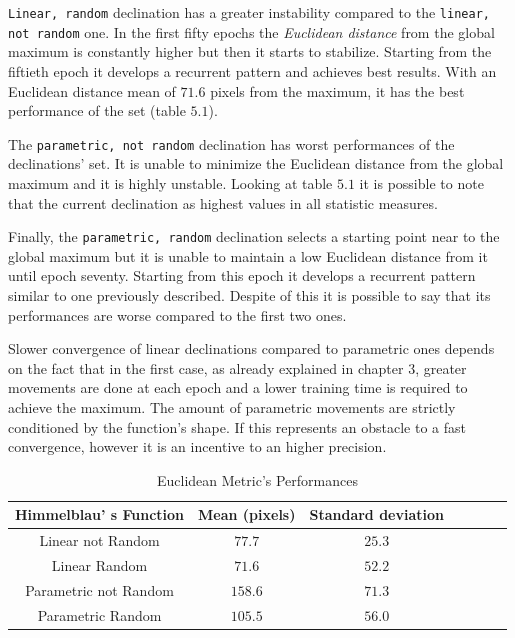 {\tt Linear, random} declination has a greater instability compared to the {\tt linear, not random} one. In the first fifty epochs the \textit{Euclidean distance} from the global maximum is constantly higher but then it starts to stabilize. Starting from the fiftieth epoch it develops a recurrent pattern and achieves best results. With an Euclidean distance mean of $71.6$ pixels from the maximum, it has the best performance of the set (table $5.1$).

The {\tt parametric, not random} declination has worst performances of the declinations' set. It is unable to minimize the Euclidean distance from the global maximum and it is highly unstable. Looking at table $5.1$ it is possible to note that the current declination as highest values in all statistic measures.

Finally, the {\tt parametric, random} declination selects a starting point near to the global maximum but it is unable to maintain a low Euclidean distance from it until epoch seventy. Starting from this epoch it develops a recurrent pattern similar to one previously described. Despite of this it is possible to say that its performances are worse compared to the first two ones.

Slower convergence of linear declinations compared to parametric ones depends on the fact that in the first case, as already explained in chapter $3$, greater movements are done at each epoch and a lower training time is required to achieve the maximum. The amount of parametric movements are strictly conditioned by the function's shape. If this represents an obstacle to a fast convergence, however it is an incentive to an higher precision. \\

\begin{table} [h!]
	\centering
	\resizebox{\linewidth}{!} {
	\begin{tabular}{c| cccccc}
		\hline \textbf{Himmelblau' s Function}
		& \textbf{Mean (pixels)} & \textbf{Standard deviation}  \\ 
		\hline Linear not Random
		& $77.7$ &\cellcolor{red!25}$25.3$ \\ 
		\hline Linear Random
		& \cellcolor{red!25}$71.6$ & $52.2$ \\ 
		\hline Parametric not Random
		& $158.6$ & $71.3$ \\ 
		\hline Parametric Random
		& $105.5$ & $56.0$ \\ 
		\hline 
	\end{tabular}
}
\label{tab:HimmelblauTabEuclidean}
\caption{Euclidean Metric's Performances}
\end{table}

